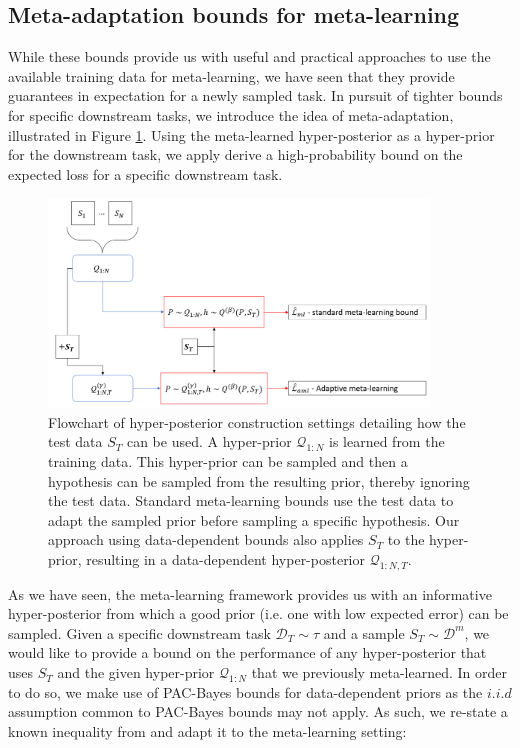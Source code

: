 \documentclass{article}
\theoremstyle{definition}
\begin{document}
\subsection{Meta-adaptation bounds for meta-learning} \label{sec:adapt-general}

While these bounds provide us with useful and practical approaches to use the available training data for meta-learning, we have seen that they provide guarantees in expectation for a newly sampled task. In pursuit of tighter bounds for specific downstream tasks, we introduce the idea of meta-adaptation, illustrated in Figure \ref{fig:data_dependant_bound}. Using the meta-learned hyper-posterior as a hyper-prior for the downstream task, we apply derive a high-probability bound on the expected loss for a specific downstream task. 

\begin{figure}
	\centering
	\includegraphics[width=0.9\textwidth]{data_dependant_adaptation.PNG}
	\caption{Flowchart of hyper-posterior construction settings detailing how the test data $S_T$ can be used. A hyper-prior $\mathcal{Q}_{1:N}$ is learned from the training data. This hyper-prior can be sampled and then a hypothesis can be sampled from the resulting prior, thereby ignoring the test data. Standard meta-learning bounds use the test data to adapt the sampled prior before sampling a specific hypothesis. Our approach using data-dependent bounds also applies $S_T$ to the hyper-prior, resulting in a data-dependent hyper-posterior $\mathcal{Q}_{1:N, T}$. }
	\label{fig:data_dependant_bound}
\end{figure}

As we have seen, the meta-learning framework provides us with an informative hyper-posterior from which a good prior (i.e. one with low expected error) can be sampled. Given a specific downstream task $\mathcal{D}_T\sim \tau$ and a sample $S_T\sim \mathcal{D}^m$, we would like to provide a bound on the performance of any hyper-posterior that uses $S_T$ and the given hyper-prior $\mathcal{Q}_{1:N}$ that we previously meta-learned. In order to do so, we make use of PAC-Bayes bounds for data-dependent priors as the $i.i.d$ assumption common to PAC-Bayes bounds may not apply. As such, we re-state a known inequality from \citet{Rivasplata2020} and adapt it to the meta-learning setting:
\end{document}
